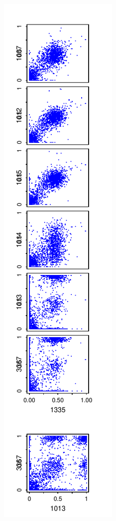 \documentclass{article}\usepackage[]{graphicx}\usepackage[]{color}
\begin{document}
\noindent%
\includegraphics{Fig1-mscat-figs/6+1julie0T.pdf}%
\end{document}
